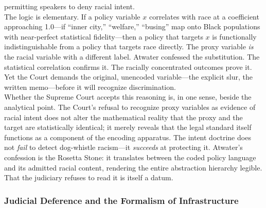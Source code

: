 \documentclass[
]{article}
\begin{document}
permitting speakers to deny racial intent.\\
The logic is elementary. If a policy variable $x$ correlates with race
at a coefficient approaching 1.0---if ``inner city,'' ``welfare,''
``busing'' map onto Black populations with near-perfect statistical
fidelity---then a policy that targets $x$ is functionally
indistinguishable from a policy that targets race directly. The proxy
variable \emph{is} the racial variable with a different label. Atwater
confessed the substitution. The statistical correlation confirms it. The
racially concentrated outcomes prove it. Yet the Court demands the
original, unencoded variable---the explicit slur, the written
memo---before it will recognize discrimination.\\
Whether the Supreme Court accepts this reasoning is, in one sense,
beside the analytical point. The Court's refusal to recognize proxy
variables as evidence of racial intent does not alter the mathematical
reality that the proxy and the target are statistically identical; it
merely reveals that the legal standard itself functions as a component
of the encoding apparatus. The intent doctrine does not \emph{fail} to
detect dog-whistle racism---it \emph{succeeds} at protecting it.
Atwater's confession is the Rosetta Stone: it translates between the
coded policy language and its admitted racial content, rendering the
entire abstraction hierarchy legible. That the judiciary refuses to read
it is itself a datum.

\subsubsection{\texorpdfstring{\textbf{Judicial Deference and the
Formalism of
Infrastructure}}{Judicial Deference and the Formalism of Infrastructure}}\label{judicial-deference-and-the-formalism-of-infrastructure}
\end{document}
